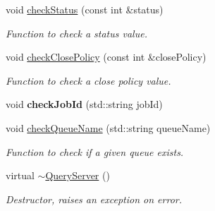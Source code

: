 \begin{DoxyCompactItemize}
void \hyperlink{classQueryServer_a358f371f74bcb2dd3e789bd20d0cb672}{checkStatus} (const int \&status)
\begin{DoxyCompactList}\small\item\em Function to check a status value. \item\end{DoxyCompactList}\item 
void \hyperlink{classQueryServer_a73cc37f1e18f4e5028d8f4d68b9b148f}{checkClosePolicy} (const int \&closePolicy)
\begin{DoxyCompactList}\small\item\em Function to check a close policy value. \item\end{DoxyCompactList}\item 
\hypertarget{classQueryServer_add7b3dc1799367f27cf0160a5ac63ecf}{
void {\bfseries checkJobId} (std::string jobId)}
\label{classQueryServer_add7b3dc1799367f27cf0160a5ac63ecf}

\item 
void \hyperlink{classQueryServer_ad0f0f43c901920be7fb7a3719bb782ba}{checkQueueName} (std::string queueName)
\begin{DoxyCompactList}\small\item\em Function to check if a given queue exists. \item\end{DoxyCompactList}\item 
\hypertarget{classQueryServer_ac1522f625d161ff74da960d37c1b58d1}{
virtual \hyperlink{classQueryServer_ac1522f625d161ff74da960d37c1b58d1}{$\sim$QueryServer} ()}
\label{classQueryServer_ac1522f625d161ff74da960d37c1b58d1}

\begin{DoxyCompactList}\small\item\em Destructor, raises an exception on error. \item\end{DoxyCompactList}\end{DoxyCompactItemize}
